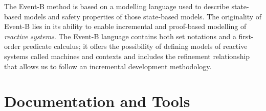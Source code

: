 \documentclass[ 12pt]{article}
\begin{document}
  The Event-B  method is based on a modelling
 language used to describe state-based models and  safety
 properties of those state-based models.  The originality of  Event-B
 lies in its ability  to
 enable incremental and proof-based modelling of \textit{reactive
   systems}. The  Event-B   language contains both set notations and a
 first-order predicate calculus; it offers the possibility of defining
 models of reactive systems called machines and contexts and includes
  the refinement relationship that allows us to follow an incremental
  development methodology.  



  

  \tableofcontents 


  



\section{Documentation and Tools}
\end{document}
